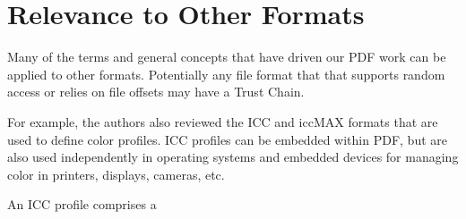 \section{Relevance to Other Formats }
\label{sec:other-formats}

Many of the terms and general concepts that have driven our PDF work
can be applied to other formats. Potentially any file format that that supports random access or relies on file offsets may have a Trust Chain.

For example, the authors also reviewed the ICC and iccMAX formats that are used to define color profiles.
ICC profiles can be embedded within PDF, but are also used independently in operating systems and embedded devices for managing color in printers, displays, cameras, etc.

An ICC profile comprises a 



